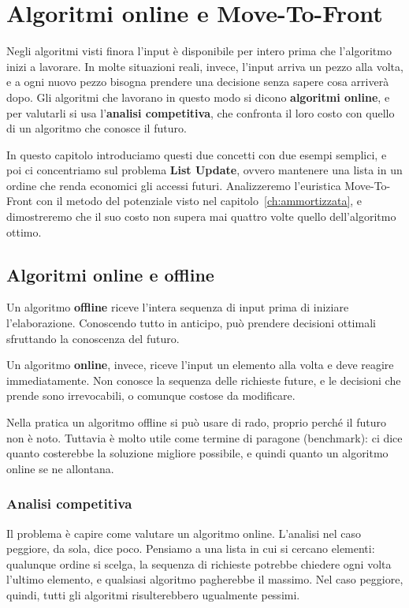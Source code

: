 \chapter{Algoritmi online e Move-To-Front}\label{ch:mtf}

Negli algoritmi visti finora l'input è disponibile per intero prima che l'algoritmo inizi a lavorare. In molte situazioni reali, invece, l'input arriva un pezzo alla volta, e a ogni nuovo pezzo bisogna prendere una decisione senza sapere cosa arriverà dopo. Gli algoritmi che lavorano in questo modo si dicono \textbf{algoritmi online}, e per valutarli si usa l'\textbf{analisi competitiva}, che confronta il loro costo con quello di un algoritmo che conosce il futuro.

In questo capitolo introduciamo questi due concetti con due esempi semplici, e poi ci concentriamo sul problema \textbf{List Update}, ovvero mantenere una lista in un ordine che renda economici gli accessi futuri. Analizzeremo l'euristica Move-To-Front con il metodo del potenziale visto nel capitolo~\ref{ch:ammortizzata}, e dimostreremo che il suo costo non supera mai quattro volte quello dell'algoritmo ottimo.

\section{Algoritmi online e offline}\label{sec:online-offline}
Un algoritmo \textbf{offline} riceve l'intera sequenza di input prima di iniziare l'elaborazione. Conoscendo tutto in anticipo, può prendere decisioni ottimali sfruttando la conoscenza del futuro.

Un algoritmo \textbf{online}, invece, riceve l'input un elemento alla volta e deve reagire immediatamente. Non conosce la sequenza delle richieste future, e le decisioni che prende sono irrevocabili, o comunque costose da modificare.

Nella pratica un algoritmo offline si può usare di rado, proprio perché il futuro non è noto. Tuttavia è molto utile come termine di paragone (benchmark): ci dice quanto costerebbe la soluzione migliore possibile, e quindi quanto un algoritmo online se ne allontana.

\subsection{Analisi competitiva}\label{sec:competitiva}
Il problema è capire come valutare un algoritmo online. L'analisi nel caso peggiore, da sola, dice poco. Pensiamo a una lista in cui si cercano elementi: qualunque ordine si scelga, la sequenza di richieste potrebbe chiedere ogni volta l'ultimo elemento, e qualsiasi algoritmo pagherebbe il massimo. Nel caso peggiore, quindi, tutti gli algoritmi risulterebbero ugualmente pessimi.

